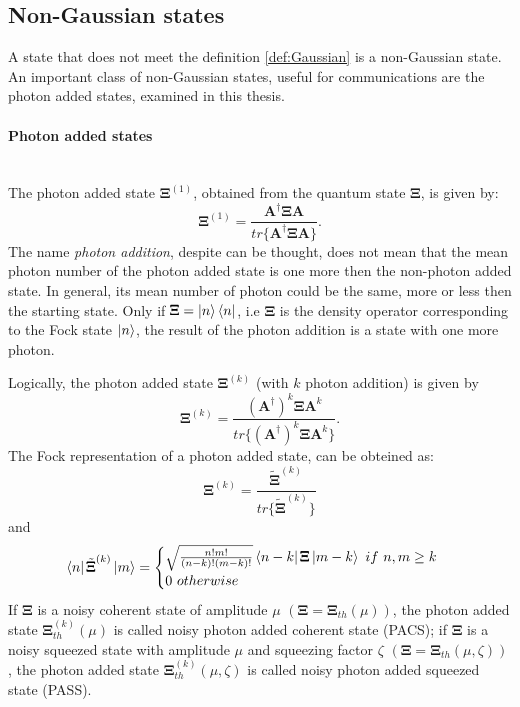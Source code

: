     \subsection{Non-Gaussian states}
    A state that does not meet the definition \ref{def:Gaussian} is a non-Gaussian state.
    An important class of non-Gaussian states, useful for communications are the photon 
    added states, examined in this thesis.

    \paragraph{Photon added states}\mbox{} \\
        \label{PAS}
        The photon added state $\pmb{\Xi}^{(1)}$, obtained from the quantum state $\pmb{\Xi}$,
        is given by:
        \begin{equation}
            \pmb{\Xi}^{(1)}=\frac{\pmb{A}^\dagger\pmb{\Xi}\pmb{A}}
            {tr\{\pmb{A}^\dagger\pmb{\Xi}\pmb{A}\}}.
        \end{equation}
        The name \emph{photon addition}, despite can be thought, does not mean that the mean photon number
        of the photon added state is one more then the non-photon added state.
        In general, its mean number of photon could be the same, more or less then the starting state.
        Only if $\pmb{\Xi}=\ket{n}\bra{n}$, i.e $\pmb{\Xi}$ is the density operator corresponding to
        the Fock state $\ket{n}$, the result of the photon addition is a state with one more photon.

        Logically, the photon added state $\pmb{\Xi}^{(k)}$ (with $k$ photon addition) is given by
        \begin{equation}
            \pmb{\Xi}^{(k)}=\frac{(\pmb{A}^\dagger)^k\pmb{\Xi}\pmb{A}^k}
            {tr\{(\pmb{A}^\dagger)^k\pmb{\Xi}\pmb{A}^k\}}.
        \end{equation}
        The Fock representation of a photon added state, can be obteined as:
        \begin{equation}
            \pmb{\Xi}^{(k)}=\frac{\tilde{\pmb{\Xi}}^{(k)}}{tr\{\tilde{\pmb{\Xi}}^{(k)}\}}
        \end{equation}
        and
        \begin{equation*}
            \bra{n}\tilde{\pmb{\Xi}}^{(k)}\ket{m}=
            \begin{cases}
                \sqrt{\frac{n!m!}{(n-k)!(m-k)!}}\bra{n-k}\pmb{\Xi}\ket{m-k}\ if\ n,m \geq k\\
                0\ otherwise
            \end{cases}
        \end{equation*}
        If $\pmb{\Xi}$ is a noisy coherent state of amplitude $\mu$ $(\pmb{\Xi}=\pmb{\Xi}_{th}(\mu))$,
        the photon added state $\pmb{\Xi}_{th}^{(k)}(\mu)$ is called noisy photon added coherent state
        (PACS); if $\pmb{\Xi}$ is a noisy squeezed state with amplitude $\mu$ and squeezing factor 
        $\zeta$ $(\pmb{\Xi}=\pmb{\Xi}_{th}(\mu,\zeta))$, the photon added state $\pmb{\Xi}_{th}^{(k)}
        (\mu,\zeta)$ is called noisy photon added squeezed state (PASS).